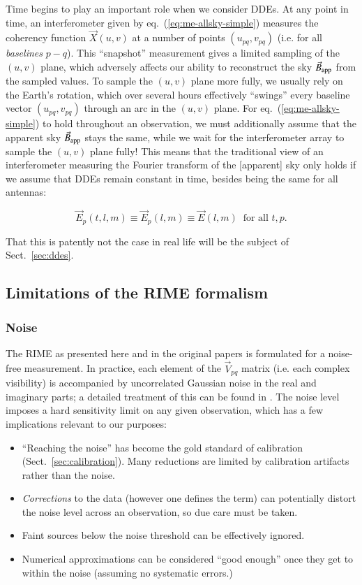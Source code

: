 \documentclass[]{aa}
\begin{document}
Time begins to play an important role when we consider DDEs. At any point in time, an interferometer given by eq.~(\ref{eq:me-allsky-simple}) measures the coherency function $\vec X(u,v)$ at a number of points $(u_{pq},v_{pq})$ (i.e. for all {\em baselines} $p-q$). This ``snapshot'' measurement gives a limited sampling of the $(u,v)$ plane, which adversely affects our ability to reconstruct the sky $\vec B_{\rm app}$ from the sampled values. To sample the $(u,v)$ plane more fully, we usually rely on the Earth's rotation, which over several hours effectively ``swings'' every baseline vector $(u_{pq},v_{pq})$ through an arc in the $(u,v)$ plane. For eq.~(\ref{eq:me-allsky-simple}) to hold throughout an observation, we must additionally assume that the apparent sky $\vec B_{\rm app}$ stays the same, while we wait for the interferometer array to sample the $(u,v)$ plane fully! This means that the traditional view of an interferometer measuring the Fourier transform of the [apparent] sky only holds if we assume that DDEs remain constant in time, besides being the same for all antennas:

\[
\vec E_p(t,l,m) \equiv \vec E_p(l,m) \equiv \vec E(l,m)\;\;\mbox{for all~} t,p. 
\]

That this is patently not the case in real life will be the subject of Sect.~\ref{sec:ddes}.


\subsection{Limitations of the RIME formalism}

\subsubsection{\label{sec:noise}Noise}

The RIME as presented here and in the original papers is formulated for a noise-free measurement. In practice, each element of the $\vec V_{pq}$ matrix (i.e. each complex visibility) is accompanied by uncorrelated Gaussian noise in the real and imaginary parts; a detailed treatment of this can be found in \citet[Sect.~6.2]{tms}. The noise level imposes a hard sensitivity limit on any given observation, which has a few implications relevant to our purposes:

\begin{itemize}
\item ``Reaching the noise'' has become the gold standard of calibration (Sect.~\ref{sec:calibration}). Many reductions are limited by calibration artifacts 
rather than the noise.
\item {\em Corrections} to the data (however one defines the term) can potentially distort the noise level across an observation, so due care must be taken.
\item Faint sources below the noise threshold can be effectively ignored.
\item Numerical approximations can be considered ``good enough'' once they get to within the noise (assuming no systematic errors.)
\end{itemize}
\end{document}
